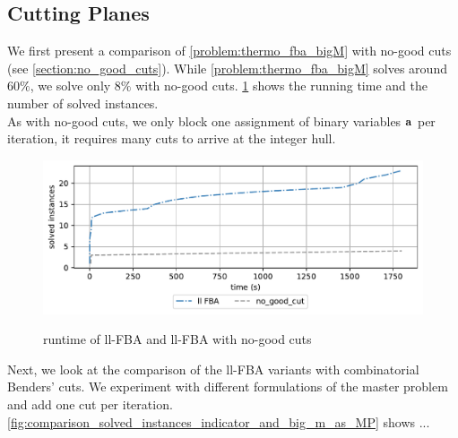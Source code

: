 \newpage
\subsection{Cutting Planes}
We first present a comparison of \cref{problem:thermo_fba_bigM} with no-good cuts (see \cref{section:no_good_cuts}). While \cref{problem:thermo_fba_bigM} solves around $60 \%$, we solve only $8\%$ with no-good cuts. \cref{fig:no_good_cuts_comparison_plot} shows the running time and the number of solved instances.\\
As with no-good cuts, we only block one assignment of binary variables $\bold a$ per iteration, it requires many cuts to arrive at the integer hull.

\begin{figure}[h!]
    \caption{runtime of ll-FBA and ll-FBA with no-good cuts}
    \centering
    \includegraphics[width=1.0\textwidth]{Images/no_good_cuts_comparison_plot.pdf}
    \label{fig:no_good_cuts_comparison_plot}
\end{figure}

Next, we look at the comparison of the ll-FBA variants with combinatorial Benders' cuts. We experiment with different formulations of the master problem and add one cut per iteration. \cref{fig:comparison_solved_instances_indicator_and_big_m_as_MP} shows ... 

